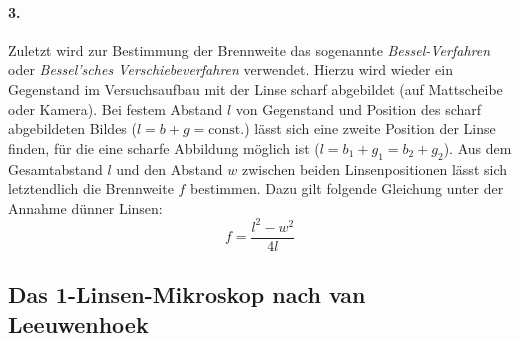\documentclass[ngerman]{scrartcl}
\begin{document}
\paragraph{3.}
Zuletzt wird zur Bestimmung der Brennweite das sogenannte \textit{Bessel-Verfahren} oder \textit{Bessel'sches Verschiebeverfahren} verwendet. Hierzu wird wieder ein Gegenstand im Versuchsaufbau mit der Linse scharf abgebildet (auf Mattscheibe oder Kamera). Bei festem Abstand $l$ von Gegenstand und Position des scharf abgebildeten Bildes ($l = b + g = \text{const.}$) lässt sich eine zweite Position der Linse finden, für die eine scharfe Abbildung möglich ist ($l = b_1 + g_1 = b_2 + g_2$). Aus dem Gesamtabstand $l$ und den Abstand $w$ zwischen beiden Linsenpositionen lässt sich letztendlich die Brennweite $f$ bestimmen. Dazu gilt folgende Gleichung unter der Annahme dünner Linsen:
%
\begin{equation}
    \label{eq:bessel}
    f = \frac{l^2 - w^2}{4 l}
\end{equation}


\subsection{Das 1-Linsen-Mikroskop nach van Leeuwenhoek}
\label{subsec:1_linsen_mikroskop_Grundlagen}
\end{document}
